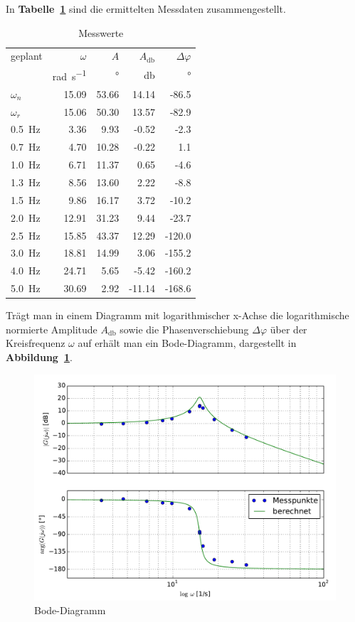 \documentclass[a4paper,12pt]{scrartcl}
\begin{document}
In \textbf{Tabelle~\ref{tab:messwerte}} sind die ermittelten Messdaten zusammengestellt.
\begin{table}[h]
	\centering
	\caption{Messwerte}
	\label{tab:messwerte}
	\begin{tabular}{lrrrr}
	\toprule
	geplant           & $\omega$&     $A$ &   $A_{\si{\decibel}}$ & $\Delta \varphi$ \\
	  & \si{\radian\per\second} & \si{\degree} & \si{\decibel} & \si{\degree} \\
	\midrule
	$\omega_n$        &  15.09 &  53.66 &  14.14 &  -86.5 \\
	$\omega_r$        &  15.06 &  50.30 &  13.57 &  -82.9 \\
	\SI{0.5}{\hertz}  &   3.36 &   9.93 &  -0.52 &   -2.3 \\
	\SI{0.7}{\hertz}  &   4.70 &  10.28 &  -0.22 &    1.1 \\
	\SI{1.0}{\hertz}  &   6.71 &  11.37 &   0.65 &   -4.6 \\
	\SI{1.3}{\hertz}  &   8.56 &  13.60 &   2.22 &   -8.8 \\
	\SI{1.5}{\hertz}  &   9.86 &  16.17 &   3.72 &  -10.2 \\
	\SI{2.0}{\hertz}  &  12.91 &  31.23 &   9.44 &  -23.7 \\
	\SI{2.5}{\hertz}  &  15.85 &  43.37 &  12.29 & -120.0 \\
	\SI{3.0}{\hertz}  &  18.81 &  14.99 &   3.06 & -155.2 \\
	\SI{4.0}{\hertz}  &  24.71 &   5.65 &  -5.42 & -160.2 \\
	\SI{5.0}{\hertz}  &  30.69 &   2.92 & -11.14 & -168.6 \\
	\bottomrule
	\end{tabular}
\end{table}

Trägt man in einem Diagramm mit logarithmischer x-Achse die logarithmische normierte Amplitude $A_{\si{\decibel}}$ sowie die Phasenverschiebung $\Delta \varphi$ über der Kreisfrequenz $\omega$ auf erhält man ein Bode-Diagramm, dargestellt in \textbf{Abbildung~\ref{fig:plot-bode}}.
\begin{figure}[h]
\centering
\includegraphics[width=\textwidth]{bode.pdf}
\caption{Bode-Diagramm}
\label{fig:plot-bode}
\end{figure}
\end{document}
